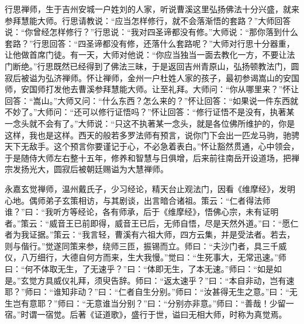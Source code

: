 \documentclass[12pt,twoside,openany]{book}
\newcommand{\kai}[1]{{\CJKfamily{kai}#1}}
\begin{document}
\kai{行思禅师，生于吉州安城一户姓刘的人家，听说曹溪这里弘扬佛法十分兴盛，就来参拜慧能大师。行思请教说：“应当怎样修行，就不会落渐悟的套路？”大师回答说：“你曾经怎样修行？”行思说：“我对四圣谛都没有修。”大师说：“那你落到什么套路？”行思回答：“四圣谛都没有修，还落什么套路呢？”大师对行思十分器重，让他做首席门徒。有一天，大师对他说：“你应当独当一面去教化一方，不要让法门断绝。”行思既然已经得到了佛法三昧，于是返回吉州青原山，弘扬顿教法门，圆寂后被谥为弘济禅师。怀让禅师，金州一户杜姓人家的孩子，最初参谒嵩山的安国师，安国师打发他去曹溪参拜慧能大师。让至礼拜。大师问：“你从哪里来？”怀让回答：“嵩山。”大师又问：“什么东西？怎么来的？”怀让回答：“如果说一件东西就不妙了。”大师问：“还可以修行证悟吗？”怀让回答：“修行证悟不是没有，执著某一念头就不会有了。”大师说：“只这不执著某一念头，就是各位佛所维护的，你是这样，我也是这样。西天的般若多罗法师有预言，说你门下会出一匹龙马驹，驰骋天下无敌手。这个预言你要谨记于心，不必急着表白。”怀让豁然贯通，心中领会，于是随侍大师左右整十五年，修养和智慧与日俱增，后来前往南岳开设道场，把禅宗发扬光大，圆寂后被朝廷赐谥为大慧禅师。}

永嘉玄觉禅师，温州戴氏子，少习经论，精天台止观法门，因看《维摩经》，发明心地。偶师弟子玄策相访，与其剧谈，出言暗合诸祖。策云：“仁者得法师谁？”曰：“我听方等经论，各有师承，后于《维摩经》，悟佛心宗，未有证明者。”策云：“威音王已前即得，威音王已后，无师自悟，尽是天然外道。”曰：“愿仁者为我证据。”策云：“我言轻，曹溪有六祖大师，四方云集，并是受法者。若去，则与偕行。”觉遂同策来参，绕师三匝，振锡而立。师曰：“夫沙门者，具三千威仪，八万细行，大德自何方而来，生大我慢。”觉曰：“生死事大，无常迅速。”师曰：“何不体取无生，了无速乎？”曰：“体即无生，了本无速。”师曰：“如是如是。”玄觉方具威仪礼拜，须臾告辞。师曰：“返太速乎？”曰：“本自非动，岂有速耶？”师曰：“谁知非动？”曰：“仁者自生分别。”师曰：“汝甚得无生之意。”曰：“无生岂有意耶？”师曰：“无意谁当分别？”曰：“分别亦非意。”师曰：“善哉！少留一宿。”时谓一宿觉。后著《证道歌》，盛行于世，谥曰无相大师，时称为真觉焉。
\end{document}
